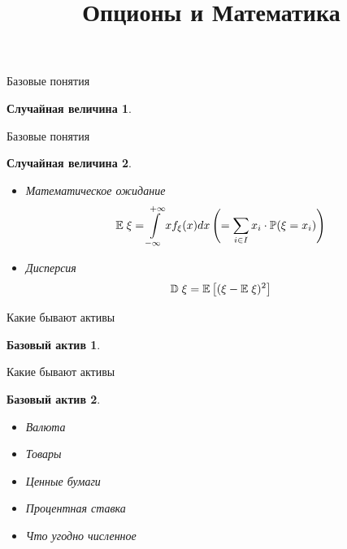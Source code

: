 \documentclass{beamer}
\title[Опционы и Математика]{Опционы и Математика}
\institute[Сбер]
{
    \\

    \centering\Large{Ваня Воробьев}\\
    \vspace{0.5cm}
    \begin{center}
        \small
        \href{https://t.me/v0r0bi0v}{t.me/v0r0bi0v} | \href{tel:+79779996957}{+79779996957} | \href{mailto:ievorobev@edu.hse.ru}{IEVorobyev@sberbank.ru}
    \end{center}
}
\newtheorem*{randomvariable*}{Случайная величина}
\newtheorem{underlying*}{Базовый актив}
\newcommand{\E}{\ensuremath{\mathbb{E}}}
\newcommand{\D}{\ensuremath{\mathbb{D}}}
\renewcommand{\P}{\ensuremath{\mathbb{P}}}
\begin{document}
    \begin{frame}
        \titlepage
    \end{frame}

    \begin{frame}{Базовые понятия}
        \begin{randomvariable*}

        \end{randomvariable*}
    \end{frame}

    \begin{frame}{Базовые понятия}
        \begin{randomvariable*}
            \begin{itemize}
                \item Математическое ожидание
                \[
                    \E \hspace{0.1cm}\xi = \int\limits_{-\infty}^{+\infty} xf_{\xi}(x) dx \left( = \sum\limits_{i\in I} x_i \cdot \P(\xi = x_i) \right)
                \]
                \item Дисперсия
                \[
                    \D \hspace{0.1cm}\xi = \E\left[(\xi - \E\hspace{0.1cm} \xi)^2\right]
                \]
            \end{itemize}
        \end{randomvariable*}
    \end{frame}

    \begin{frame}{Какие бывают активы}
        \begin{underlying*}
        \end{underlying*}
    \end{frame}

    \begin{frame}{Какие бывают активы}
        \begin{underlying*}
            \begin{itemize}
                \item Валюта
                \item Товары
                \item Ценные бумаги
                \item Процентная ставка
                \item Что угодно численное
            \end{itemize}
        \end{underlying*}
    \end{frame}
\end{document}
